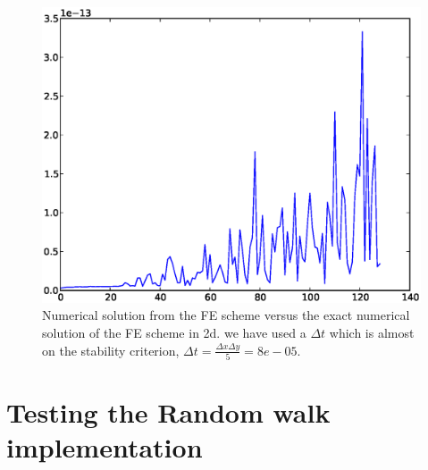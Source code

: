 \begin{figure}[H]
 \centering
 \includegraphics[scale=0.7]{Figures/exact_numerical_2d_n130.eps}
 \caption{Numerical solution from the FE scheme versus the exact numerical solution of the FE scheme in 2d. we have used a $\Delta t$ which is almost on the stability criterion, $\Delta t = \frac{\Delta x \Delta y}{5} = 8e-05$.}
 \label{exact_numerical_2d_n130}
\end{figure}

\section{Testing the Random walk implementation}\label{testing_random_walks}



